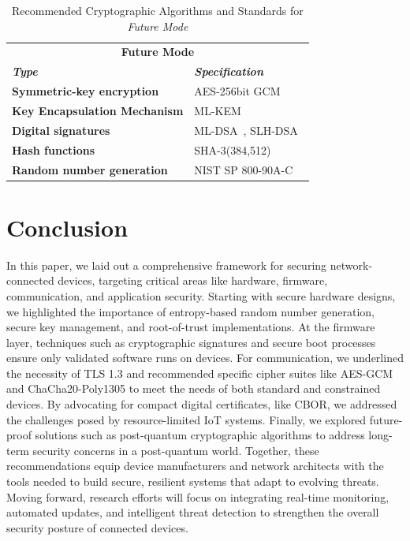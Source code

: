 \documentclass[pdflatex,sn-mathphys-num]{sn-jnl}%
\theoremstyle{thmstyleone}%
\theoremstyle{thmstyletwo}%
\theoremstyle{thmstylethree}%
\begin{document}


 \begin{table}[h!]
    \centering
    \begin{tabular}{@{}p{} p{}@{}}
        \hline
        \multicolumn{2}{c}{\textbf{Future Mode}} \\ 
        \textbf{\textit{Type}} & \textbf{\textit{Specification}} \\
        \hline
        \textbf{Symmetric-key encryption} & AES-256bit GCM  \\
        \textbf{Key Encapsulation Mechanism} & ML-KEM~\cite{nist_fips_203} \\
        \textbf{Digital signatures} & ML-DSA~\cite{nist_fips_204},     SLH-DSA~\cite{nist_fips_205} \\
        \textbf{Hash functions} & SHA-3(384,512)~\cite{nist_fips_202}\\
        \textbf{Random number generation} & NIST SP 800-90A-C~\cite{nist80090a} \\
        \hline
    \end{tabular}
    \caption{Recommended Cryptographic Algorithms and Standards for \emph{Future Mode}}
    \label{tab:primitives_fm}
\end{table}

\section{Conclusion}
In this paper, we laid out a comprehensive framework for securing network-connected devices, targeting critical areas like hardware, firmware, communication, and application security. Starting with secure hardware designs, we highlighted the importance of entropy-based random number generation, secure key management, and root-of-trust implementations. At the firmware layer, techniques such as cryptographic signatures and secure boot processes ensure only validated software runs on devices. For communication, we underlined the necessity of TLS 1.3 and recommended specific cipher suites like AES-GCM and ChaCha20-Poly1305 to meet the needs of both standard and constrained devices. By advocating for compact digital certificates, like CBOR, we addressed the challenges posed by resource-limited IoT systems. Finally, we explored future-proof solutions such as post-quantum cryptographic algorithms to address long-term security concerns in a post-quantum world. Together, these recommendations equip device manufacturers and network architects with the tools needed to build secure, resilient systems that adapt to evolving threats. Moving forward, research efforts will focus on integrating real-time monitoring, automated updates, and intelligent threat detection to strengthen the overall security posture of connected devices.

\end{document}
